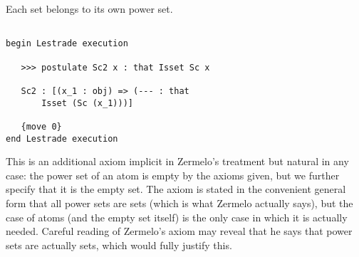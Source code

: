 \documentclass[12pt]{article}
\begin{document}
Each set belongs to its own power set.

\begin{verbatim}

begin Lestrade execution

   >>> postulate Sc2 x : that Isset Sc x

   Sc2 : [(x_1 : obj) => (--- : that 
       Isset (Sc (x_1)))]

   {move 0}
end Lestrade execution
\end{verbatim}

This is an additional axiom implicit in Zermelo's treatment but natural in any case:  the power set of an atom is empty by the axioms given, but we further
specify that it is the empty set.  The axiom is stated in the convenient general form that all power sets are sets (which is what Zermelo actually says), but the case of atoms (and the empty set itself)
is the only case in which it is actually needed.  Careful reading of Zermelo's axiom may reveal that he says that power sets are actually sets, which would fully justify this.
\end{document}
